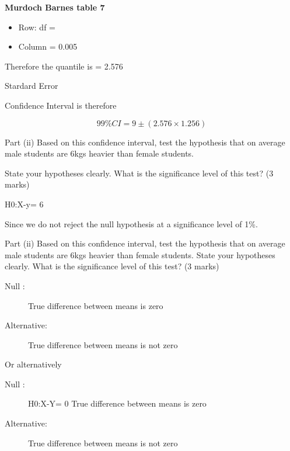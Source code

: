 \begin{framed}
\noindent \textbf{Murdoch Barnes table 7}

\begin{itemize}
\item Row: df =  
\item Column = 0.005

\end{itemize}

Therefore the quantile is =  2.576 
\end{framed}

Stardard Error






Confidence Interval is therefore

\[99\% CI = 9 \pm (2.576 \times 1.256) \]


Part (ii)
Based on this confidence interval, test the hypothesis that on average male students are 6kgs heavier than female students.

State your hypotheses clearly. What is the significance level of this test?   (3 marks)

H0:X-y= 6




Since  we do not reject the null hypothesis at a significance level of 1\%.





Part (ii)
Based on this confidence interval, test the hypothesis that on average male students are 6kgs heavier than female students.
State your hypotheses clearly. What is the significance level of this test?   (3 marks)

\begin{description}

\item[Null :]                 True difference between means is zero

\item[Alternative:]         True difference between means is not zero
\end{description}
Or alternatively

\begin{description}
\item[Null :]              H0:X-Y= 0   True difference between means is zero

\item[Alternative:]         True difference between means is not zero
\end{description}




